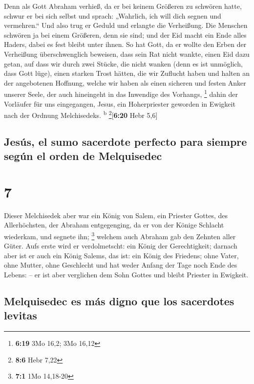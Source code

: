  Denn als Gott Abraham verhieß, da er bei keinem Größeren
zu schwören hatte, schwur er bei sich selbst  und sprach:
„Wahrlich, ich will dich segnen und vermehren.``  Und
also trug er Geduld und erlangte die Verheißung.  Die
Menschen schwören ja bei einem Größeren, denn sie sind; und der Eid
macht ein Ende alles Haders, dabei es fest bleibt unter ihnen.
 So hat Gott, da er wollte den Erben der Verheißung
überschwenglich beweisen, dass sein Rat nicht wankte, einen Eid dazu
getan,  auf dass wir durch zwei Stücke, die nicht wanken
(denn es ist unmöglich, dass Gott lüge), einen starken Trost hätten, die
wir Zuflucht haben und halten an der angebotenen Hoffnung,
 welche wir haben als einen sicheren und festen Anker
unserer Seele, der auch hineingeht in das Inwendige des Vorhangs,
\footnote{\textbf{6:19} 3Mo 16,2; 3Mo 16,12}  dahin der
Vorläufer für uns eingegangen, Jesus, ein Hoherpriester geworden in
Ewigkeit nach der Ordnung Melchisedeks. \textsuperscript{b}
\footnote{\textbf{8:6} Hebr 7,22}{[}\textbf{6:20} Hebr 5,6{]}

\hypertarget{jesuxfas-el-sumo-sacerdote-perfecto-para-siempre-seguxfan-el-orden-de-melquisedec}{%
\subsection{Jesús, el sumo sacerdote perfecto para siempre según el
orden de
Melquisedec}\label{jesuxfas-el-sumo-sacerdote-perfecto-para-siempre-seguxfan-el-orden-de-melquisedec}}

\hypertarget{section-6}{%
\section{7}\label{section-6}}

 Dieser Melchisedek aber war ein König von Salem, ein
Priester Gottes, des Allerhöchsten, der Abraham entgegenging, da er von
der Könige Schlacht wiederkam, und segnete ihn; \footnote{\textbf{7:1}
  1Mo 14,18-20}  welchem auch Abraham gab den Zehnten
aller Güter. Aufs erste wird er verdolmetscht: ein König der
Gerechtigkeit; darnach aber ist er auch ein König Salems, das ist: ein
König des Friedens;  ohne Vater, ohne Mutter, ohne
Geschlecht und hat weder Anfang der Tage noch Ende des Lebens: -- er ist
aber verglichen dem Sohn Gottes und bleibt Priester in Ewigkeit.

\hypertarget{melquisedec-es-muxe1s-digno-que-los-sacerdotes-levitas}{%
\subsection{Melquisedec es más digno que los sacerdotes
levitas}\label{melquisedec-es-muxe1s-digno-que-los-sacerdotes-levitas}}

